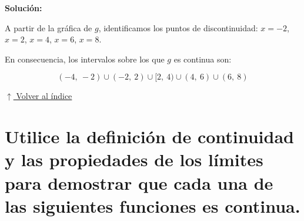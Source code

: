 \documentclass[12pt]{article}
\newcommand{\solucion}{%
    \vspace{0.8em}%
    \textbf{Solución:}%
}
\newcommand{\volverindice}{%
    \vspace{1em}%
    \begin{flushright}%
        \hyperlink{indice}{\small $\uparrow$ Volver al índice}%
    \end{flushright}%
}
\begin{document}
\begin{enumerate}[label=\alph*.-]
    \solucion
 
    A partir de la gráfica de $g$, identificamos los puntos de discontinuidad: $x = -2$, $x = 2$, $x = 4$, $x = 6$, $x = 8$.
 
    En consecuencia, los intervalos sobre los que $g$ es continua son:
 
    \[
    \boxed{(-4,\ -2) \cup (-2,\ 2) \cup [2,\ 4) \cup (4,\ 6) \cup (6,\ 8)}
    \]
 
\end{enumerate}
 
\volverindice
\newpage

\newpage
\section[Continuidad en un número]{Utilice la definición de continuidad y las propiedades de los límites para demostrar que cada una de las siguientes funciones es continua.}
\end{document}
